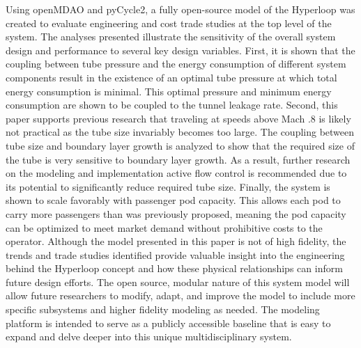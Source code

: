 Using openMDAO and pyCycle2, a fully open-source model of the Hyperloop was created to evaluate engineering and cost trade studies at the top level of the system. The analyses presented illustrate the sensitivity of the overall system design and performance to several key design variables. First, it is shown that the coupling between tube pressure and the energy consumption of different system components result in the existence of an optimal tube pressure at which total energy consumption is minimal. This optimal pressure and minimum energy consumption are shown to be coupled to the tunnel leakage rate. Second, this paper supports previous research that traveling at speeds above Mach .8 is likely not practical as the tube size invariably becomes too large. The coupling between tube size and boundary layer growth is analyzed to show that the required size of the tube is very sensitive to boundary layer growth. As a result, further research on the modeling and implementation active flow control is recommended due to its potential to significantly reduce required tube size. Finally, the system is shown to scale favorably with passenger pod capacity. This allows each pod to carry more passengers than was previously proposed, meaning the pod capacity can be optimized to meet market demand without prohibitive costs to the operator. Although the model presented in this paper is not of high fidelity, the trends and trade studies identified provide valuable insight into the engineering behind the Hyperloop concept and how these physical relationships can inform future design efforts. The open source, modular nature of this system model will allow future researchers to modify, adapt, and improve the model to include more specific subsystems and higher fidelity modeling as needed. The modeling platform is intended to serve as a publicly accessible baseline that is easy to expand and delve deeper into this unique multidisciplinary system.